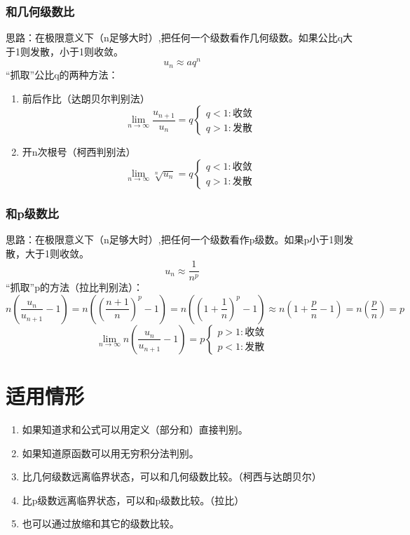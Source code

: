 \documentclass[UTF8]{ctexart}
\begin{document}
\subsubsection{和几何级数比}
思路：在极限意义下（n足够大时）,把任何一个级数看作几何级数。如果公比q大于1则发散，小于1则收敛。
\[u_n\approx aq^n\]
“抓取”公比q的两种方法：
\begin{enumerate}
    \item 前后作比（达朗贝尔判别法）
\[\lim_{n\to \infty}\frac{u_{n+1}}{u_n}=q \begin{cases}
    q<1:\text{收敛}\\
    q>1:\text{发散}
\end{cases}\]
    \item 开n次根号（柯西判别法）
\[\lim_{n\to \infty}\sqrt[n]{u_n}=q \begin{cases}
    q<1:\text{收敛}\\
    q>1:\text{发散}
\end{cases}\]
\end{enumerate}
\subsubsection{和p级数比}
思路：在极限意义下（n足够大时）,把任何一个级数看作p级数。如果p小于1则发散，大于1则收敛。
\[u_n\approx \frac{1}{n^p}\]
“抓取”p的方法（拉比判别法）：
\[n\left(\frac{u_n}{u_{n+1}}-1 \right)=n\left( \left(\frac{n+1}{n}\right)^p-1\right)=n((1+\frac{1}{n})^p-1)\approx n(1+\frac{p}{n}-1)=n(\frac{p}{n})=p\]
\[\lim_{n\to \infty}n\left(\frac{u_n}{u_{n+1}}-1 \right)=p\begin{cases}
    p>1:\text{收敛}\\
    p<1:\text{发散}
\end{cases}\]
\section{适用情形}
\begin{enumerate}
    \item 如果知道求和公式可以用定义（部分和）直接判别。
    \item 如果知道原函数可以用无穷积分法判别。
    \item 比几何级数远离临界状态，可以和几何级数比较。（柯西与达朗贝尔）
    \item 比p级数远离临界状态，可以和p级数比较。（拉比）
    \item 也可以通过放缩和其它的级数比较。
\end{enumerate}
\end{document}
